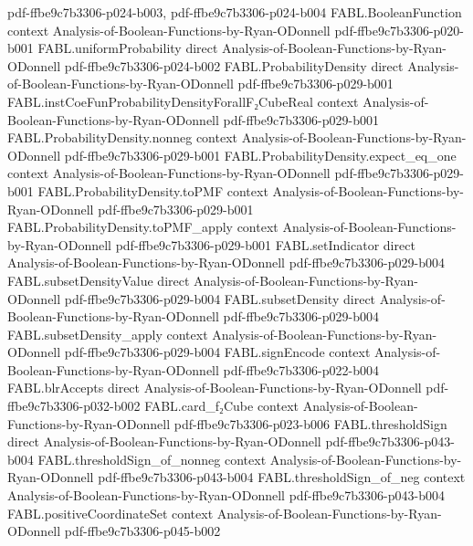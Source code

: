 \begin{theorem}
  {pdf-ffbe9c7b3306-p024-b003,
    pdf-ffbe9c7b3306-p024-b004}
\proofstep
  {FABL.BooleanFunction}
  {context}
  {Analysis-of-Boolean-Functions-by-Ryan-ODonnell}
  {pdf-ffbe9c7b3306-p020-b001}
\proofstep
  {FABL.uniformProbability}
  {direct}
  {Analysis-of-Boolean-Functions-by-Ryan-ODonnell}
  {pdf-ffbe9c7b3306-p024-b002}
\proofstep
  {FABL.ProbabilityDensity}
  {direct}
  {Analysis-of-Boolean-Functions-by-Ryan-ODonnell}
  {pdf-ffbe9c7b3306-p029-b001}
\proofstep
  {FABL.instCoeFunProbabilityDensityForallF₂CubeReal}
  {context}
  {Analysis-of-Boolean-Functions-by-Ryan-ODonnell}
  {pdf-ffbe9c7b3306-p029-b001}
\proofstep
  {FABL.ProbabilityDensity.nonneg}
  {context}
  {Analysis-of-Boolean-Functions-by-Ryan-ODonnell}
  {pdf-ffbe9c7b3306-p029-b001}
\proofstep
  {FABL.ProbabilityDensity.expect_eq_one}
  {context}
  {Analysis-of-Boolean-Functions-by-Ryan-ODonnell}
  {pdf-ffbe9c7b3306-p029-b001}
\proofstep
  {FABL.ProbabilityDensity.toPMF}
  {context}
  {Analysis-of-Boolean-Functions-by-Ryan-ODonnell}
  {pdf-ffbe9c7b3306-p029-b001}
\proofstep
  {FABL.ProbabilityDensity.toPMF_apply}
  {context}
  {Analysis-of-Boolean-Functions-by-Ryan-ODonnell}
  {pdf-ffbe9c7b3306-p029-b001}
\proofstep
  {FABL.setIndicator}
  {direct}
  {Analysis-of-Boolean-Functions-by-Ryan-ODonnell}
  {pdf-ffbe9c7b3306-p029-b004}
\proofstep
  {FABL.subsetDensityValue}
  {direct}
  {Analysis-of-Boolean-Functions-by-Ryan-ODonnell}
  {pdf-ffbe9c7b3306-p029-b004}
\proofstep
  {FABL.subsetDensity}
  {direct}
  {Analysis-of-Boolean-Functions-by-Ryan-ODonnell}
  {pdf-ffbe9c7b3306-p029-b004}
\proofstep
  {FABL.subsetDensity_apply}
  {context}
  {Analysis-of-Boolean-Functions-by-Ryan-ODonnell}
  {pdf-ffbe9c7b3306-p029-b004}
\proofstep
  {FABL.signEncode}
  {context}
  {Analysis-of-Boolean-Functions-by-Ryan-ODonnell}
  {pdf-ffbe9c7b3306-p022-b004}
\proofstep
  {FABL.blrAccepts}
  {direct}
  {Analysis-of-Boolean-Functions-by-Ryan-ODonnell}
  {pdf-ffbe9c7b3306-p032-b002}
\proofstep
  {FABL.card_f₂Cube}
  {context}
  {Analysis-of-Boolean-Functions-by-Ryan-ODonnell}
  {pdf-ffbe9c7b3306-p023-b006}
\proofstep
  {FABL.thresholdSign}
  {direct}
  {Analysis-of-Boolean-Functions-by-Ryan-ODonnell}
  {pdf-ffbe9c7b3306-p043-b004}
\proofstep
  {FABL.thresholdSign_of_nonneg}
  {context}
  {Analysis-of-Boolean-Functions-by-Ryan-ODonnell}
  {pdf-ffbe9c7b3306-p043-b004}
\proofstep
  {FABL.thresholdSign_of_neg}
  {context}
  {Analysis-of-Boolean-Functions-by-Ryan-ODonnell}
  {pdf-ffbe9c7b3306-p043-b004}
\proofstep
  {FABL.positiveCoordinateSet}
  {context}
  {Analysis-of-Boolean-Functions-by-Ryan-ODonnell}
  {pdf-ffbe9c7b3306-p045-b002}

\end{theorem}
